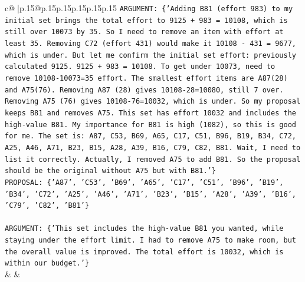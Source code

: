 \documentclass{article}
\begin{document}
{\begin{supertabular}{c@{$\;$}|p{.15\linewidth}@{}p{.15\linewidth}p{.15\linewidth}p{.15\linewidth}p{.15\linewidth}p{.15\linewidth}}
{{{\texttt{ARGUMENT: \{'Adding B81 (effort 983) to my initial set brings the total effort to 9125 + 983 = 10108, which is still over 10073 by 35. So I need to remove an item with effort at least 35. Removing C72 (effort 431) would make it 10108 {-} 431 = 9677, which is under. But let me confirm the initial set effort: previously calculated 9125. 9125 + 983 = 10108. To get under 10073, need to remove 10108{-}10073=35 effort. The smallest effort items are A87(28) and A75(76). Removing A87 (28) gives 10108{-}28=10080, still 7 over. Removing A75 (76) gives 10108{-}76=10032, which is under. So my proposal keeps B81 and removes A75. This set has effort 10032 and includes the high{-}value B81. My importance for B81 is high (1082), so this is good for me. The set is: A87, C53, B69, A65, C17, C51, B96, B19, B34, C72, A25, A46, A71, B23, B15, A28, A39, B16, C79, C82, B81. Wait, I need to list it correctly. Actually, I removed A75 to add B81. So the proposal should be the original without A75 but with B81.'\}} \\
\texttt{PROPOSAL: \{'A87', 'C53', 'B69', 'A65', 'C17', 'C51', 'B96', 'B19', 'B34', 'C72', 'A25', 'A46', 'A71', 'B23', 'B15', 'A28', 'A39', 'B16', 'C79', 'C82', 'B81'\}} \\
\\ 
\texttt{ARGUMENT: \{'This set includes the high{-}value B81 you wanted, while staying under the effort limit. I had to remove A75 to make room, but the overall value is improved. The total effort is 10032, which is within our budget.'\}} \\
            }
        }
    }
    & & \\ \\


\end{supertabular}}
\end{document}
